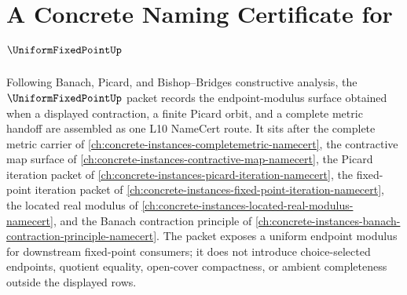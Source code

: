 \chapter{A Concrete Naming Certificate for $\UniformFixedPointUp$}
\label{ch:concrete-instances-uniform-fixed-point-namecert}

Following Banach, Picard, and Bishop--Bridges constructive analysis, the $\UniformFixedPointUp$ packet records the endpoint-modulus surface obtained when a displayed contraction, a finite Picard orbit, and a complete metric handoff are assembled as one L10 NameCert route. It sits after the complete metric carrier of \autoref{ch:concrete-instances-completemetric-namecert}, the contractive map surface of \autoref{ch:concrete-instances-contractive-map-namecert}, the Picard iteration packet of \autoref{ch:concrete-instances-picard-iteration-namecert}, the fixed-point iteration packet of \autoref{ch:concrete-instances-fixed-point-iteration-namecert}, the located real modulus of \autoref{ch:concrete-instances-located-real-modulus-namecert}, and the Banach contraction principle of \autoref{ch:concrete-instances-banach-contraction-principle-namecert}. The packet exposes a uniform endpoint modulus for downstream fixed-point consumers; it does not introduce choice-selected endpoints, quotient equality, open-cover compactness, or ambient completeness outside the displayed rows.

